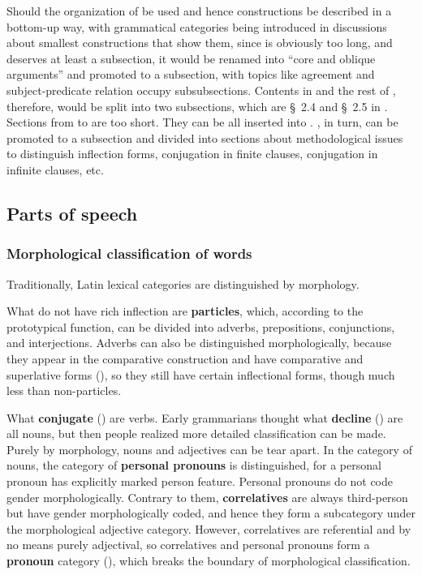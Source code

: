 \documentclass{article}
\newcommand*{\citesec}[1]{\S~{#1}}
\newcommand*{\citechap}[1]{chap.~{#1}}
\newcommand*{\concept}[1]{\textbf{#1}}
\begin{document}
Should the organization of \citet[\citechap{2}]{jacques2021grammar} be used
and hence constructions be described in a bottom-up way,
with grammatical categories being introduced in discussions about smallest constructions that show them,
since  is obviously too long, and deserves at least a subsection,
it would be renamed into ``core and oblique arguments'' and promoted to a subsection,
with topics like agreement and subject-predicate relation occupy subsubsections.
Contents in  and the rest of ,
therefore, would be split into two subsections, 
which are \citesec{2.4} and \citesec{2.5} in \citet{jacques2021grammar}.
Sections from  to  are too short.
They can be all inserted into .
, in turn, can be 
promoted to a subsection and divided into 
sections about methodological issues to distinguish inflection forms,
conjugation in finite clauses,
conjugation in infinite clauses, etc.

\subsection{Parts of speech}


\subsubsection{Morphological classification of words}

Traditionally, Latin lexical categories are distinguished by morphology.

What do not have rich inflection are \concept{particles},
which, according to the prototypical function,
can be divided into adverbs, prepositions, conjunctions, and interjections.
Adverbs can also be distinguished morphologically,
because they appear in the comparative construction and have comparative and superlative forms 
(),
so they still have certain inflectional forms, though much less than non-particles.

What \concept{conjugate} () are verbs.
Early grammarians thought what \concept{decline} ()
are all nouns,
but then people realized more detailed classification can be made.
Purely by morphology, nouns and adjectives can be tear apart.
In the category of nouns, the category of \concept{personal pronouns} is distinguished,
for a personal pronoun has explicitly marked person feature.
Personal pronouns do not code gender morphologically.
Contrary to them, \concept{correlatives} are always third-person but have gender morphologically coded,
and hence they form a subcategory under the morphological adjective category.
However, correlatives are referential and by no means purely adjectival,
so correlatives and personal pronouns form a \concept{pronoun} category (),
which breaks the boundary of morphological classification.
\end{document}

